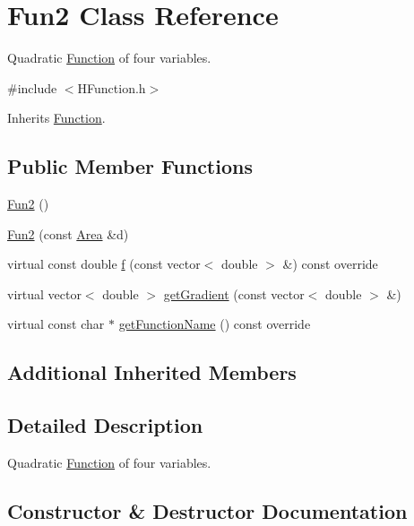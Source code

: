 \hypertarget{class_fun2}{}\section{Fun2 Class Reference}
\label{class_fun2}


Quadratic \hyperlink{class_function}{Function} of four variables.  




{\ttfamily \#include $<$H\+Function.\+h$>$}



Inherits \hyperlink{class_function}{Function}.

\subsection*{Public Member Functions}
\begin{DoxyCompactItemize}
\item 
\hyperlink{class_fun2_a024c340dc96072eb755c07b49af26318}{Fun2} ()
\item 
\hyperlink{class_fun2_a07884d5793a0d74008d0125757d4ecda}{Fun2} (const \hyperlink{class_area}{Area} \&d)
\item 
virtual const double \hyperlink{class_fun2_a6e9544da42cee65e9cbc8b56b233877c}{f} (const vector$<$ double $>$ \&) const override
\item 
virtual vector$<$ double $>$ \hyperlink{class_fun2_adf2435fbf6e848c1ffa2a2287b489a45}{get\+Gradient} (const vector$<$ double $>$ \&)
\item 
virtual const char $\ast$ \hyperlink{class_fun2_ac5702f1a8350b7a7f4b796b99cd5b08f}{get\+Function\+Name} () const override
\end{DoxyCompactItemize}
\subsection*{Additional Inherited Members}


\subsection{Detailed Description}
Quadratic \hyperlink{class_function}{Function} of four variables. 

\subsection{Constructor \& Destructor Documentation}
\mbox{\label{class_fun2_a024c340dc96072eb755c07b49af26318}} 
